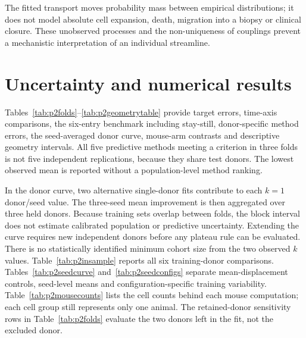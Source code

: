 The fitted transport moves probability mass between empirical distributions; it does not model absolute cell expansion, death, migration into a biopsy or clinical closure. These unobserved processes and the non-uniqueness of couplings prevent a mechanistic interpretation of an individual streamline.

\section{Uncertainty and numerical results}
Tables~\ref{tab:p2folds}--\ref{tab:p2geometrytable} provide target errors, time-axis comparisons, the six-entry benchmark including stay-still, donor-specific method errors, the seed-averaged donor curve, mouse-arm contrasts and descriptive geometry intervals. All five predictive methods meeting a criterion in three folds is not five independent replications, because they share test donors. The lowest observed mean is reported without a population-level method ranking.

In the donor curve, two alternative single-donor fits contribute to each $k=1$ donor/seed value. The three-seed mean improvement is then aggregated over three held donors. Because training sets overlap between folds, the block interval does not estimate calibrated population or predictive uncertainty. Extending the curve requires new independent donors before any plateau rule can be evaluated. There is no statistically identified minimum cohort size from the two observed $k$ values.
Table~\ref{tab:p2insample} reports all six training-donor comparisons. Tables~\ref{tab:p2seedcurve} and~\ref{tab:p2seedconfigs} separate mean-displacement controls, seed-level means and configuration-specific training variability. Table~\ref{tab:p2mousecounts} lists the cell counts behind each mouse computation; each cell group still represents only one animal. The retained-donor sensitivity rows in Table~\ref{tab:p2folds} evaluate the two donors left in the fit, not the excluded donor.

